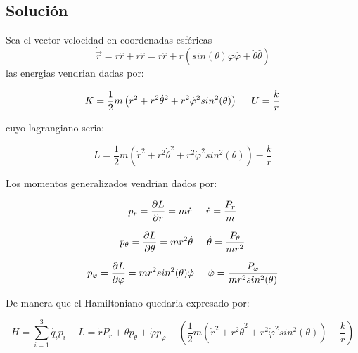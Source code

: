 \documentclass[12 pt]{article}
\begin{document}
\subsection*{Solución}

Sea el vector velocidad en coordenadas esféricas
\begin{equation*}
\dot{\vec{r}} = \dot{r} \hat{r} + r \dot{\hat{r}} = \dot{r} \hat{r} + r \left(sin(\theta)\dot{\varphi} \hat{\varphi} + \dot{\theta}\hat{\theta}\right)
\end{equation*}
las energias vendrian dadas por:


\begin{equation*}
K = \frac{1}{2} m \left( \dot{r}^{2} + r^{2}\dot{\theta}^{2} + r^{2}\dot{\varphi}^{2}sin^{2}(\theta)  \right) \hspace{0.5 cm} U= \frac{k}{r}
\end{equation*}


cuyo lagrangiano seria:

\begin{equation*}
L =  \frac{1}{2} m \left( \dot{r}^{2} + r^{2}\dot{\theta}^{2} + r^{2}\dot{\varphi}^{2}sin^{2}(\theta)\right)  -\frac{k}{r}
\end{equation*}


Los momentos generalizados vendrian dados por:


\begin{equation*}
p_{r}= \frac{\partial L }{\partial r} =m \dot{r}  \hspace{0.5cm} \dot{r} = \frac{P_{r}}{m}
\end{equation*}

\begin{equation*}
p_{\theta}= \frac{\partial L }{\partial \theta} =	mr^{2} \dot{\theta}  \hspace{0.5cm} \dot{\theta} =\frac{P_{\theta}}{m r^{2}}
\end{equation*}


\begin{equation*}
p_{\varphi}= \frac{\partial L }{\partial \varphi}= m r^{2}sin^{2}(\theta) \dot{\varphi}  \hspace{0.5cm} \dot{\varphi}= \frac{P_{\varphi}}{m r^{2}sin^{2}(\theta)}
\end{equation*}


De manera que el Hamiltoniano quedaria expresado por:

\begin{equation*}
H = \sum_{i=1}^{3} \dot{q_{i}} p_{i} - L = \dot{r}P_{r} +\dot{\theta} p_{\theta} +   \dot{\varphi} p_{\varphi} -\left(\frac{1}{2} m \left( \dot{r}^{2} + r^{2}\dot{\theta}^{2} + r^{2}\dot{\varphi}^{2}sin^{2}(\theta)\right)  -\frac{k}{r} \right) 
\end{equation*}
\end{document}
